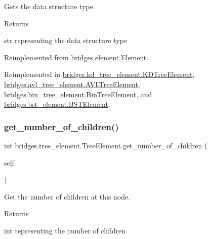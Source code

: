 Gets the data structure type. 

\begin{DoxyReturn}{Returns}


str representing the data structure type 
\end{DoxyReturn}


Reimplemented from \mbox{\hyperlink{classbridges_1_1element_1_1_element_ada235252964d163ab1df8a9609b2af5b}{bridges.\+element.\+Element}}.



Reimplemented in \mbox{\hyperlink{classbridges_1_1kd__tree__element_1_1_k_d_tree_element_a4b38af960542ccc8c3b74d90ee9570e2}{bridges.\+kd\+\_\+tree\+\_\+element.\+K\+D\+Tree\+Element}}, \mbox{\hyperlink{classbridges_1_1avl__tree__element_1_1_a_v_l_tree_element_a811dd4cebd36fda6531f6cbeb873c0e5}{bridges.\+avl\+\_\+tree\+\_\+element.\+A\+V\+L\+Tree\+Element}}, \mbox{\hyperlink{classbridges_1_1bin__tree__element_1_1_bin_tree_element_a9238744e18486fb8882238394f5efe7c}{bridges.\+bin\+\_\+tree\+\_\+element.\+Bin\+Tree\+Element}}, and \mbox{\hyperlink{classbridges_1_1bst__element_1_1_b_s_t_element_a8e655e06ba0f77b7e2681b6d291f39de}{bridges.\+bst\+\_\+element.\+B\+S\+T\+Element}}.

\mbox{\label{classbridges_1_1tree__element_1_1_tree_element_a52b2386b667b8c6befb85f956d36321a}} 
\subsubsection{\texorpdfstring{get\_number\_of\_children()}{get\_number\_of\_children()}}
{\footnotesize\ttfamily  int bridges.\+tree\+\_\+element.\+Tree\+Element.\+get\+\_\+number\+\_\+of\+\_\+children (\begin{DoxyParamCaption}\item[{}]{self }\end{DoxyParamCaption})}



Get the number of children at this node. 

\begin{DoxyReturn}{Returns}


int representing the number of children 
\end{DoxyReturn}
\mbox{\label{classbridges_1_1tree__element_1_1_tree_element_abf4bdabe99cdd3f96db41f36d87cc25e}} 
